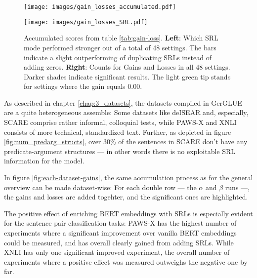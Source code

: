 \begin{figure}
  \begin{minipage}{0.45\linewidth}
  \vspace{0pt}
    \texttt{[image: images/gain\_losses\_accumulated.pdf]}
  \end{minipage}
  \hfill
  \begin{minipage}{0.45\linewidth}
  \vspace{0pt}
    \texttt{[image: images/gain\_losses\_SRL.pdf]}
  \end{minipage}
  \label{fig:classification-gains}
  \caption[Accumulated Gains and Losses.]{Accumulated scores from table \ref{tab:gain-loss}. \textbf{Left}: Which SRL mode performed stronger out of a total of 48 settings. The bars indicate a slight outperforming of duplicating SRLs instead of adding zeros. \textbf{Right}: Counts for Gains and Losses in all 48 settings. Darker shades indicate significant results. The light green tip stands for settings where the gain equals 0.00.}
\end{figure}

As described in chapter \ref{chap:3_datasets}, the datasets compiled in GerGLUE are a quite
heterogeneous assemble: Some datasets like deISEAR and, especially, SCARE comprise rather
informal, colloquial tests, while PAWS-X and XNLI consists of more technical, standardized text.
Further, as depicted in figure \ref{fig:num_predarg_structs}, over 30\% of the sentences
in SCARE don't have any predicate-argument structures --- in other words there is no exploitable SRL
information for the model.

In figure \ref{fig:each-dataset-gains}, the same accumulation process as for the general overview
can be made dataset-wise: For each double row --- the $\alpha$ and $\beta$ runs ---, the gains and
losses are added togehter, and the significant ones are highlighted.

The positive effect of enriching BERT embeddings with SRLs is especially evident for
the sentence pair classification tasks: PAWS-X has the highest number of experiments where a significant
improvement over vanilla BERT embeddings could be measured, and has overall clearly gained from adding
SRLs. While XNLI has only one significant improved experiment, the overall number of experiments
where a positive effect was measured outweighs the negative one by far.

